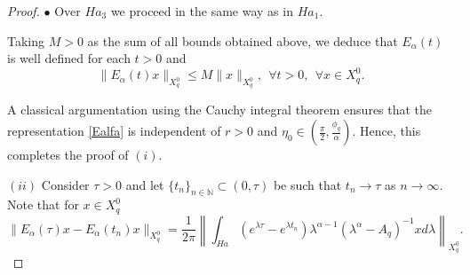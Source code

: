 \documentclass[12pt,reqno]{amsart}
\begin{document}
\begin{proof}
		\noindent $\bullet$ Over $Ha_3$ we proceed in the same way as in $Ha_1.$
		

	Taking $M>0$ as the sum of all bounds obtained above, we deduce that $E_\alpha(t)$ is well defined for each $t>0$ and
	$$\|E_{\alpha}(t)x\|_{X^{0}_{q}}\leq M\|x\|_{X^{0}_{q}}, \ \ \forall t>0, \ \ \forall x\in X^{0}_{q}.$$ 
	
	A classical argumentation using the Cauchy integral theorem ensures that the representation \eqref{Ealfa} is independent of $r>0$ and $\eta_0\in\left(\frac{\pi}{2},\frac{\phi_q}{\alpha}\right)$. Hence, this completes the proof of $(i)$.
	
	
	
	
	
		
		
		\noindent $(ii)$ Consider $\tau>0$ and let $\{t_n\}_{n\in\mathbb{N}}\subset (0,\tau)$ be such that $t_n\rightarrow \tau$ as $n\rightarrow\infty.$ Note that for $x\in X^{0}_{q}$
		\[\|E_\alpha(\tau)x-E_\alpha(t_n)x\|_{X^{0}_{q}} = \frac{1}{2\pi}\left\|\int_{Ha}(e^{\lambda\tau}-e^{\lambda t_n})\lambda^{\alpha-1}(\lambda^{\alpha}-A_q)^{-1}xd\lambda \right\|_{X^{0}_{q}}.\]
		

\end{proof}
\end{document}
